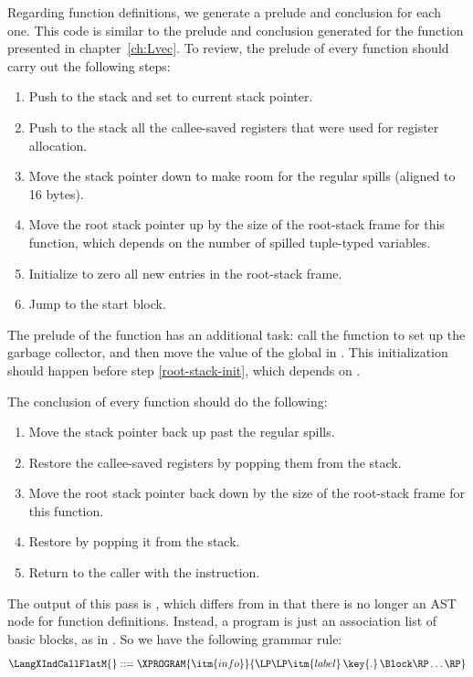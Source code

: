 \documentclass[7x10]{TimesAPriori_MIT}%
\numberwithin{theorem}{chapter}
\numberwithin{definition}{chapter}
\numberwithin{equation}{chapter}
\begin{document}
Regarding function definitions, we generate a prelude and conclusion
for each one. This code is similar to the prelude and conclusion
generated for the  function presented in
chapter~\ref{ch:Lvec}. To review, the prelude of every function should
carry out the following steps:
\begin{enumerate}
\item Push  to the stack and set  to current stack
  pointer.
\item Push to the stack all the callee-saved registers that were
  used for register allocation.
\item Move the stack pointer  down to make room for the
  regular spills (aligned to 16 bytes).
\item Move the root stack pointer  up by the size of the
  root-stack frame for this function, which depends on the number of
  spilled tuple-typed variables. \label{root-stack-init}
\item Initialize to zero all new entries in the root-stack frame.
\item Jump to the start block.
\end{enumerate}
The prelude of the  function has an additional task: call
the  function to set up the garbage collector, and
then move the value of the global  in
. This initialization should happen before step
\ref{root-stack-init}, which depends on .

The conclusion of every function should do the following:
\begin{enumerate}
\item Move the stack pointer back up past the regular spills.
\item Restore the callee-saved registers by popping them from the
  stack.
\item Move the root stack pointer back down by the size of the
  root-stack frame for this function.
\item Restore  by popping it from the stack.
\item Return to the caller with the  instruction.
\end{enumerate}

The output of this pass is \LangXIndCallFlat{}, which differs from
\LangXIndCall{} in that there is no longer an AST node for function
definitions. Instead, a program is just an association list of basic
blocks, as in \LangXGlobal{}. So we have the following grammar rule:
\[
\LangXIndCallFlatM{} ::= \XPROGRAM{\itm{info}}{\LP\LP\itm{label} \,\key{.}\, \Block \RP\ldots\RP}
\]
\end{document}
